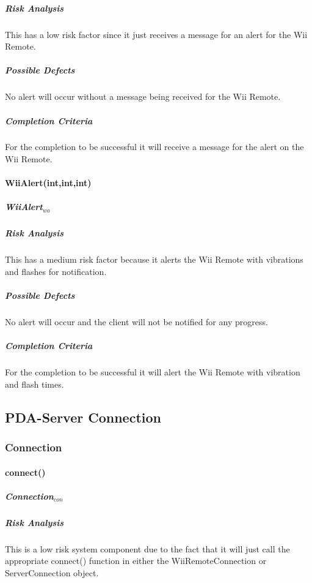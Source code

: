 \documentclass{article}
\begin{document}
\subparagraph{Risk Analysis}
This has a low risk factor since it just receives a message for an alert for the Wii Remote.

\subparagraph{Possible Defects}
No alert will occur without a message being received for the Wii Remote.

\subparagraph{Completion Criteria}
For the completion to be successful it will receive a message for the alert on the Wii Remote.


\paragraph{WiiAlert(int,int,int)}

\subparagraph{WiiAlert$_{wa}$}

\subparagraph{Risk Analysis}
This has a medium risk factor because it alerts the Wii Remote with vibrations and flashes for notification.

\subparagraph{Possible Defects}
No alert will occur and the client will not be notified for any progress.

\subparagraph{Completion Criteria}
For the completion to be successful it will alert the Wii Remote with vibration and flash times.




\subsection{PDA-Server Connection}

\subsubsection{Connection}

\paragraph{connect()}

\subparagraph{Connection$_{con}$}

\subparagraph{Risk Analysis}
This is a low risk system component due to the fact that it will just call the appropriate connect() function in either the WiiRemoteConnection or ServerConnection object.
\end{document}
